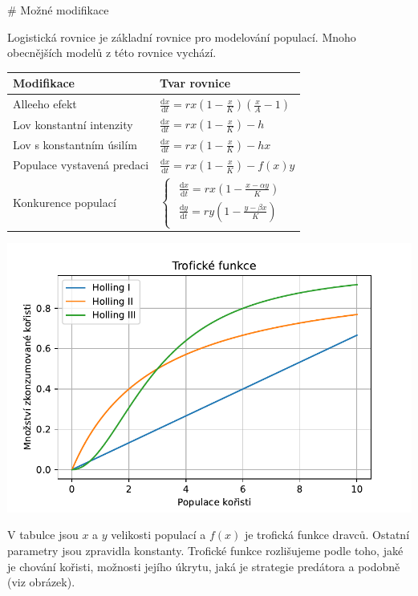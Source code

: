 \documentclass{article}
\begin{document}
\begin{markdown}

# Možné modifikace

Logistická rovnice je základní rovnice pro modelování populací. Mnoho obecnějších modelů z této rovnice vychází.

\end{markdown}

\begin{minipage}[t]{0.45\linewidth}
  \vspace*{0pt}
\everymath{\displaystyle}
\begin{tabular}{ll}
  \toprule
  Modifikace&Tvar rovnice\\
  \midrule
Alleeho efekt & $\frac{\mathrm dx}{\mathrm dt}=rx\left(1-\frac xK\right)\left(\frac
xA-1\right)$\\[5mm]
Lov konstantní intenzity & $\frac{\mathrm dx}{\mathrm dt}=rx\left(1-\frac xK\right)-h$\\[5mm]
Lov s konstantním úsilím & $\frac{\mathrm dx}{\mathrm dt}=rx\left(1-\frac xK\right)-hx$\\[5mm]
Populace vystavená predaci & $\frac{\mathrm dx}{\mathrm dt}=rx\left(1-\frac xK\right)-f(x)y$\\[5mm]
  Konkurence populací & $\begin{cases}
                        \begin{aligned}
           \frac{\mathrm dx}{\mathrm dt}=rx\left(1-\frac {x-\alpha y}K\right)\\
           \frac{\mathrm dy}{\mathrm dt}=ry\left(1-\frac {y-\beta x}K\right)
                        \end{aligned}
\end{cases}
$\\
  \bottomrule
\end{tabular}

\end{minipage}\hfill
\begin{minipage}[t]{0.45\linewidth}
  \vspace*{0pt}

  \includegraphics[width=\linewidth]{holling.pdf}

  \vspace*{0pt}
\end{minipage}


\bigskip
V tabulce jsou $x$ a $y$ velikosti populací a $f(x)$ je trofická funkce dravců. Ostatní parametry jsou zpravidla konstanty.
Trofické funkce rozlišujeme podle toho, jaké je chování kořisti, možnosti jejího úkrytu, jaká je strategie predátora a podobně (viz obrázek).
\end{document}
